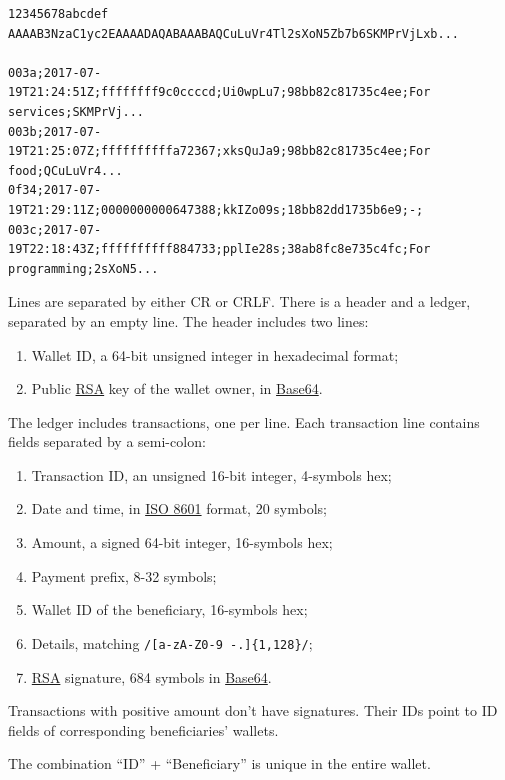 \documentclass[11pt,oneside]{article}
\newcommand\dd[1]{\colorbox{gray!30}{\texttt{#1}}}
\begin{document}
\begin{verbatim}
12345678abcdef
AAAAB3NzaC1yc2EAAAADAQABAAABAQCuLuVr4Tl2sXoN5Zb7b6SKMPrVjLxb...

003a;2017-07-19T21:24:51Z;ffffffff9c0ccccd;Ui0wpLu7;98bb82c81735c4ee;For services;SKMPrVj...
003b;2017-07-19T21:25:07Z;ffffffffffa72367;xksQuJa9;98bb82c81735c4ee;For food;QCuLuVr4...
0f34;2017-07-19T21:29:11Z;0000000000647388;kkIZo09s;18bb82dd1735b6e9;-;
003c;2017-07-19T22:18:43Z;ffffffffff884733;pplIe28s;38ab8fc8e735c4fc;For programming;2sXoN5...
\end{verbatim}

Lines are separated by either CR or CRLF.
There is a header and a ledger, separated by an empty line.
The header includes two lines:

\begin{enumerate}
  \item Wallet ID, a 64-bit unsigned integer in hexadecimal format;
  \item Public \href{https://en.wikipedia.org/wiki/RSA_(cryptosystem)}{RSA}
    key of the wallet owner, in \href{https://en.wikipedia.org/wiki/Base64}{Base64}.
\end{enumerate}

The ledger includes transactions, one per line. Each transaction line
contains fields separated by a semi-colon:

\begin{enumerate}
  \item Transaction ID, an unsigned 16-bit integer, 4-symbols hex;
  \item Date and time, in \href{https://en.wikipedia.org/wiki/ISO_8601}{ISO 8601} format, 20 symbols;
  \item Amount, a signed 64-bit integer, 16-symbols hex;
  \item Payment prefix, 8-32 symbols;
  \item Wallet ID of the beneficiary, 16-symbols hex;
  \item Details, matching \dd{/[a-zA-Z0-9 -.]\{1,128\}/};
  \item \href{https://en.wikipedia.org/wiki/RSA_(cryptosystem)}{RSA} signature,
    684 symbols in \href{https://en.wikipedia.org/wiki/Base64}{Base64}.
\end{enumerate}

Transactions with positive amount don't have signatures.
Their IDs point to ID fields of corresponding beneficiaries' wallets.

The combination ``ID'' + ``Beneficiary'' is unique in the entire wallet.
\end{document}

